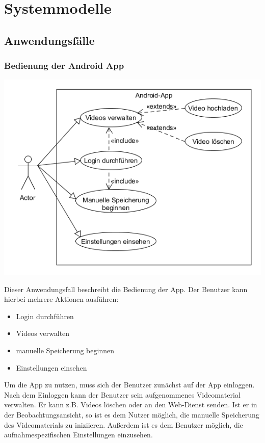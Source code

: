 \chapter{Systemmodelle}
\section{Anwendungsfälle}
\subsection{Bedienung der Android App}
\begin{center}
\includegraphics[width=1\textwidth]{subtopicsFuncspec/Res/systemModels/App-AFD-UML.png}
\end{center}
Dieser Anwendungsfall beschreibt die Bedienung der \gls{App}. 
Der Benutzer kann hierbei mehrere Aktionen ausführen:
\begin{itemize}
\itemsep0pt
\item Login durchführen
\item Videos verwalten
\item manuelle Speicherung beginnen
\item Einstellungen einsehen
\end{itemize}
Um die \gls{App} zu nutzen, muss sich der Benutzer zunächst auf der \gls{App} einloggen. Nach dem Einloggen kann der Benutzer sein aufgenommenes Videomaterial verwalten. Er kann z.B. Videos löschen oder an den \gls{Web-Dienst} senden.
Ist er in der Beobachtungsansicht, so ist es dem Nutzer möglich, die manuelle Speicherung des Videomaterials zu iniziieren. Außerdem ist es dem Benutzer möglich, die aufnahmespezifischen Einstellungen einzusehen.

